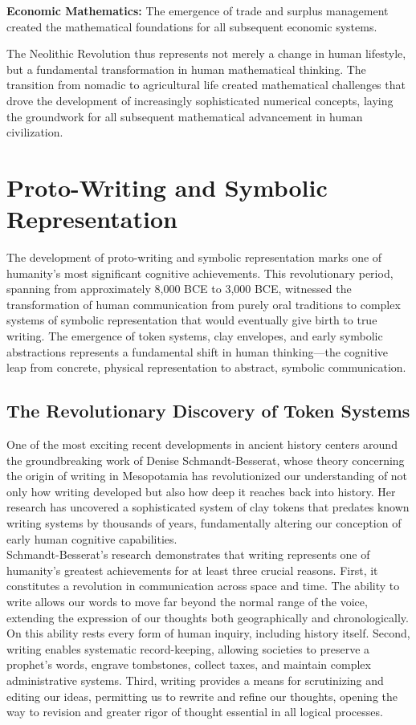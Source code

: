 \documentclass[12pt, oneside, openany]{book}
\begin{document}
\textbf{Economic Mathematics:} The emergence of trade and surplus management created the mathematical foundations for all subsequent economic systems.

The Neolithic Revolution thus represents not merely a change in human lifestyle, but a fundamental transformation in human mathematical thinking. The transition from nomadic to agricultural life created mathematical challenges that drove the development of increasingly sophisticated numerical concepts, laying the groundwork for all subsequent mathematical advancement in human civilization.

\section{Proto-Writing and Symbolic Representation}

The development of proto-writing and symbolic representation marks one of humanity's most significant cognitive achievements. This revolutionary period, spanning from approximately 8,000 BCE to 3,000 BCE, witnessed the transformation of human communication from purely oral traditions to complex systems of symbolic representation that would eventually give birth to true writing. The emergence of token systems, clay envelopes, and early symbolic abstractions represents a fundamental shift in human thinking—the cognitive leap from concrete, physical representation to abstract, symbolic communication.

\subsection{The Revolutionary Discovery of Token Systems}

One of the most exciting recent developments in ancient history centers around the groundbreaking work of Denise Schmandt-Besserat, whose theory concerning the origin of writing in Mesopotamia has revolutionized our understanding of not only how writing developed but also how deep it reaches back into history. Her research has uncovered a sophisticated system of clay tokens that predates known writing systems by thousands of years, fundamentally altering our conception of early human cognitive capabilities.\\
Schmandt-Besserat's research demonstrates that writing represents one of humanity's greatest achievements for at least three crucial reasons. First, it constitutes a revolution in communication across space and time. The ability to write allows our words to move far beyond the normal range of the voice, extending the expression of our thoughts both geographically and chronologically. On this ability rests every form of human inquiry, including history itself. Second, writing enables systematic record-keeping, allowing societies to preserve a prophet's words, engrave tombstones, collect taxes, and maintain complex administrative systems. Third, writing provides a means for scrutinizing and editing our ideas, permitting us to rewrite and refine our thoughts, opening the way to revision and greater rigor of thought essential in all logical processes.
\end{document}
